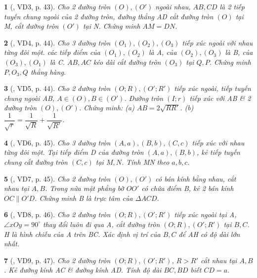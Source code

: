 \documentclass{article}
\newtheorem{baitoan}{}
\begin{document}
\begin{baitoan}[\cite{TLCT_THCS_Toan_9_hinh_hoc}, VD3, p. 43]
	Cho 2 đường tròn $(O),(O')$ ngoài nhau, $AB,CD$ là 2 tiếp tuyến chung ngoài của 2 đường tròn, đường thẳng AD cắt đường tròn $(O)$ tại M, cắt đường tròn $(O')$ tại N. Chứng minh $AM = DN$.
\end{baitoan}

\begin{baitoan}[\cite{TLCT_THCS_Toan_9_hinh_hoc}, VD4, p. 44]
	Cho 3 đường tròn $(O_1),(O_2),(O_3)$ tiếp xúc ngoài với nhau từng đôi một. các tiếp điểm của $(O_1),(O_2)$ là A, của $(O_2),(O_3)$ là B, của $(O_3),(O_1)$ là C. $AB,AC$ kéo dài cắt đường tròn $(O_3)$ tại $Q,P$. Chứng minh $P,O_3,Q$ thẳng hàng.
\end{baitoan}

\begin{baitoan}[\cite{TLCT_THCS_Toan_9_hinh_hoc}, VD5, p. 44]
	Cho 2 đường tròn $(O;R),(O';R')$ tiếp xúc ngoài, tiếp tuyến chung ngoài AB, $A\in(O),B\in(O')$. Đường tròn $(I;r)$ tiếp xúc với AB \& 2 đường tròn $(O),(O')$. Chứng minh: (a) $AB = 2\sqrt{RR'}$. (b) $\dfrac{1}{\sqrt{r}} = \dfrac{1}{\sqrt{R}} + \dfrac{1}{\sqrt{R'}}$.
\end{baitoan}

\begin{baitoan}[\cite{TLCT_THCS_Toan_9_hinh_hoc}, VD6, p. 45]
	Cho 3 đường tròn $(A,a),(B,b),(C,c)$ tiếp xúc với nhau từng đôi một. Tại tiếp điểm D của đường tròn $(A,a),(B,b)$, kẻ tiếp tuyến chung cắt đường tròn $(C,c)$ tại $M,N$. Tính MN theo $a,b,c$.
\end{baitoan}

\begin{baitoan}[\cite{TLCT_THCS_Toan_9_hinh_hoc}, VD7, p. 45]
	Cho 2 đường tròn $(O),(O')$ có bán kính bằng nhau, cắt nhau tại $A,B$. Trong nửa mặt phẳng bờ $OO'$ có chứa điểm B, kẻ 2 bán kính $OC\parallel O'D$. Chứng minh B là trực tâm của $\Delta ACD$.
\end{baitoan}

\begin{baitoan}[\cite{TLCT_THCS_Toan_9_hinh_hoc}, VD8, p. 46]
	Cho 2 đường tròn $(O;R),(O';R')$ tiếp xúc ngoài tại A, $\angle{xOy} = 90^\circ$  thay đổi luôn đi qua A, cắt đường tròn $(O;R),(O';R')$ tại $B,C$. H là hình chiếu của A trên BC. Xác định vị trí của $B,C$ để AH có độ dài lớn nhất.
\end{baitoan}

\begin{baitoan}[\cite{TLCT_THCS_Toan_9_hinh_hoc}, VD9, p. 47]
	Cho 2 đường tròn $(O;R),(O';R')$, $R > R'$ cắt nhau tại $A,B$. Kẻ đường kính AC \& đường kính AD. Tính độ dài $BC,BD$ biết $CD = a$.
\end{baitoan}
\end{document}
